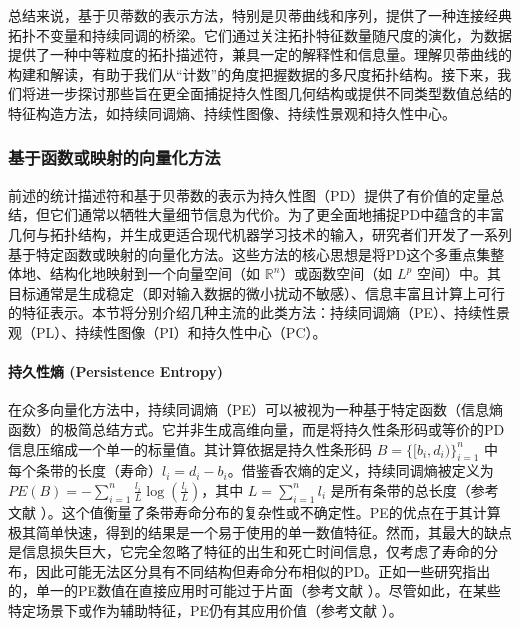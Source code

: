             总结来说，基于贝蒂数的表示方法，特别是贝蒂曲线和序列，提供了一种连接经典拓扑不变量和持续同调的桥梁。它们通过关注拓扑特征数量随尺度的演化，为数据提供了一种中等粒度的拓扑描述符，兼具一定的解释性和信息量。理解贝蒂曲线的构建和解读，有助于我们从“计数”的角度把握数据的多尺度拓扑结构。接下来，我们将进一步探讨那些旨在更全面捕捉持久性图几何结构或提供不同类型数值总结的特征构造方法，如持续同调熵、持续性图像、持续性景观和持久性中心。
            
        \subsubsection{基于函数或映射的向量化方法}
            \label{sec:pd_vectorization_mapping}

            前述的统计描述符和基于贝蒂数的表示为持久性图（PD）提供了有价值的定量总结，但它们通常以牺牲大量细节信息为代价。为了更全面地捕捉PD中蕴含的丰富几何与拓扑结构，并生成更适合现代机器学习技术的输入，研究者们开发了一系列基于特定函数或映射的向量化方法。这些方法的核心思想是将PD这个多重点集整体地、结构化地映射到一个向量空间（如 $\mathbb{R}^n$）或函数空间（如 $L^p$ 空间）中。其目标通常是生成稳定（即对输入数据的微小扰动不敏感）、信息丰富且计算上可行的特征表示。本节将分别介绍几种主流的此类方法：持续同调熵（PE）、持续性景观（PL）、持续性图像（PI）和持久性中心（PC）。

            \paragraph{持久性熵 (Persistence Entropy)}
            \label{sec:feat_pe}
            在众多向量化方法中，持续同调熵（PE）可以被视为一种基于特定函数（信息熵函数）的极简总结方式。它并非生成高维向量，而是将持久性条形码或等价的PD信息压缩成一个单一的标量值。其计算依据是持久性条形码 $B = \{[b_i, d_i)\}_{i=1}^n$ 中每个条带的长度（寿命）$l_i = d_i - b_i$。借鉴香农熵的定义，持续同调熵被定义为 $PE(B) = -\sum_{i=1}^{n} \frac{l_i}{L} \log(\frac{l_i}{L})$，其中 $L = \sum_{i=1}^{n} l_i$ 是所有条带的总长度（参考文献 \cite{source:59, source:287}）。这个值衡量了条带寿命分布的复杂性或不确定性。PE的优点在于其计算极其简单快速，得到的结果是一个易于使用的单一数值特征。然而，其最大的缺点是信息损失巨大，它完全忽略了特征的出生和死亡时间信息，仅考虑了寿命的分布，因此可能无法区分具有不同结构但寿命分布相似的PD。正如一些研究指出的，单一的PE数值在直接应用时可能过于片面（参考文献 \cite{source:88}）。尽管如此，在某些特定场景下或作为辅助特征，PE仍有其应用价值（参考文献 \cite{source:384, source:386}）。

